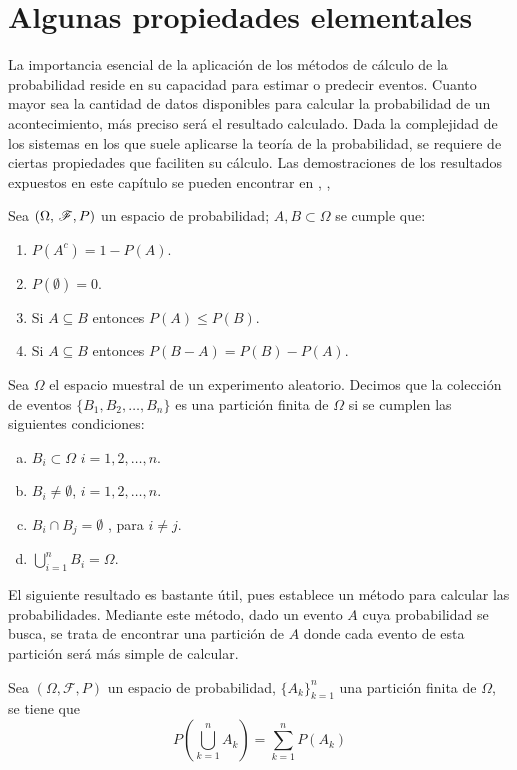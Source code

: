 \section{Algunas propiedades elementales}
La importancia esencial de la aplicación de los métodos de cálculo de la probabilidad reside en su capacidad para estimar o predecir eventos. Cuanto mayor sea la cantidad de datos disponibles para calcular la probabilidad de un acontecimiento, más preciso será el resultado calculado. Dada la complejidad de los sistemas en los que suele aplicarse la teoría de la probabilidad, se requiere de ciertas propiedades que faciliten su cálculo.
Las demostraciones de los resultados expuestos en este capítulo se pueden encontrar en \cite{intro-probabilidad}, \cite{Feller},\cite{Rincon1} \cite{Rincon2}
\begin{Prop}
    Sea $(\Omega,\thinspace\mathscr{F},P)$ un espacio de probabilidad; $A,B\subset\Omega$ se cumple que:
    \begin{enumerate}
        \item $P(A^c)=1-P(A)$.
        \item $P(\emptyset)=0$.
        \item Si $A\subseteq B$ entonces $P(A)\leq P(B)$.
        \item Si $A\subseteq B$ entonces $P(B-A)=P(B)-P(A)$.
    \end{enumerate}
    \end{Prop}
\begin{Def}
    Sea $\Omega$ el espacio muestral de un experimento aleatorio. Decimos que la colección de eventos $\{B_1,B_2,\ldots,B_n\}$ es una partición finita de $\Omega$ si se cumplen las siguientes condiciones:
    \begin{enumerate}[a)]
        \item $B_i\subset\Omega$ $i=1,2,\ldots,n$.
        \item $B_i\not=\emptyset$, $i=1,2,\ldots,n$.
        \item $B_i\cap B_j=\emptyset$ , para $i\not= j$.
        \item $\bigcup_{i=1}^n B_i=\Omega$.
    \end{enumerate}
\end{Def}
El siguiente resultado es bastante útil, pues establece un método para calcular las probabilidades. Mediante este método, dado un evento $A$ cuya probabilidad se busca, se trata de encontrar una partición de $A$ donde cada evento de esta partición será más simple de calcular.
\begin{Prop}
    Sea $(\Omega,\mathscr{F},P)$ un espacio de probabilidad, $\{A_k\}_{k=1}^n$ una partición finita de $\Omega$, se tiene que
    $$P(\bigcup_{k=1}^n A_k)=\sum_{k=1}^n P(A_k)$$ 
\end{Prop}
